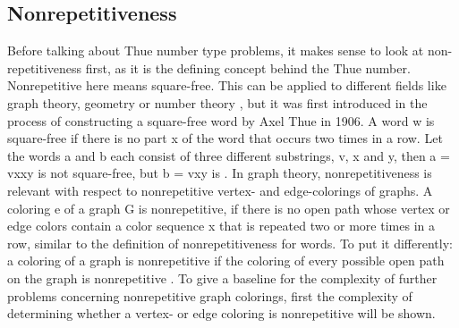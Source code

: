 \documentclass[12pt,a4paper]{article}
\begin{document}
\subsection{Nonrepetitiveness}
Before talking about Thue number type problems, it makes sense to look at non-repetitiveness first, as it is the defining concept behind the  Thue number. Nonrepetitive here means square-free. This can be applied to different fields like graph theory, geometry or number theory \citep{Grytczuk2008}, but it was first introduced in the process of constructing a square-free word by Axel Thue in 1906. A word w is square-free if there is no part x of the word that occurs two times in a row. Let the words a and b each consist of three different substrings, v, x and y, then a = vxxy is not square-free, but b = vxy is \citep{Thue1906}.
\newline
In graph theory, nonrepetitiveness is relevant with respect to nonrepetitive vertex- \citep{Marx2009} and edge-colorings of graphs. A coloring e of a graph G is nonrepetitive, if there is no open path whose vertex or edge colors contain a color sequence x that is repeated two or more times in a row, similar to the definition of nonrepetitiveness for words. To put it differently: a coloring of a graph is nonrepetitive if the coloring of every possible open path on the graph is nonrepetitive \citep{Alon2002}. To give a baseline for the complexity of further problems concerning nonrepetitive graph colorings, first the complexity of determining whether a vertex- or edge coloring is nonrepetitive will be shown.
\end{document}
